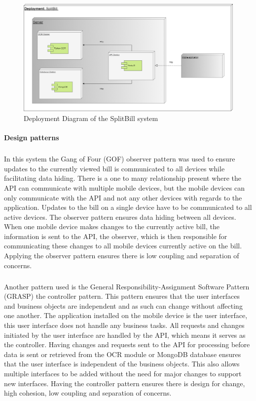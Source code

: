 \documentclass[12pt,a4paper]{article}
\begin{document}
\begin{figure}[h]
\includegraphics[width= \textwidth]{Deployment.png}
\caption{Deployment Diagram of the SplitBill system}
\centering
\end{figure}

\paragraph{Design patterns}
\subparagraph{} In this system the Gang of Four (GOF) observer pattern was used to ensure updates to the currently viewed bill is communicated to all devices while facilitating data hiding. There is a one to many relationship present where the API can communicate with multiple mobile devices, but the mobile devices can only communicate with the API and not any other devices with regards to the application. Updates to the bill on a single device have to be communicated to all active devices. The observer pattern ensures data hiding between all devices. When one mobile device makes changes to the currently active bill, the information is sent to the API, the observer, which is then responsible for communicating these changes to all mobile devices currently active on the bill. Applying the observer pattern ensures there is low coupling and separation of concerns. 

\subparagraph{} Another pattern used is the General Responsibility-Assignment Software Pattern (GRASP) the controller pattern. This pattern ensures that the user interfaces and business objects are independent and as such can change without affecting one another. The application installed on the mobile device is the user interface, this user interface does not handle any business tasks. All requests and changes initiated by the user interface are handled by the API, which means it serves as the controller. Having changes and requests sent to the API for processing before data is sent or retrieved from the OCR module or MongoDB database ensures that the user interface is independent of the business objects. This also allows multiple interfaces to be added without the need for major changes to support new interfaces. Having the controller pattern ensures there is design for change, high cohesion, low coupling and separation of concerns.   
\end{document}
